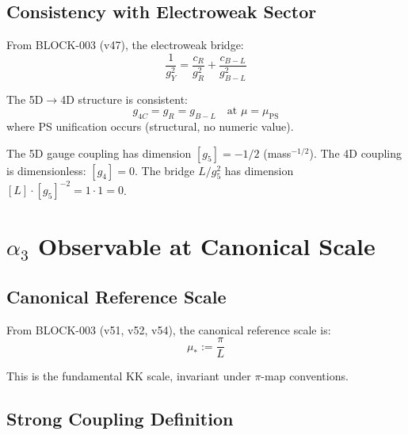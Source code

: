 \documentclass[11pt,a4paper]{article}
\theoremstyle{definition}
\begin{document}
\subsection{Consistency with Electroweak Sector}
\label{subsec:ew-consistency}

From BLOCK-003 (v47), the electroweak bridge:
\begin{equation}
  \label{eq:ew-bridge-recall}
  \frac{1}{g_Y^2} = \frac{c_R}{g_R^2} + \frac{c_{B-L}}{g_{B-L}^2}
\end{equation}

The 5D$\to$4D structure is consistent:
\begin{equation}
  \label{eq:consistency-check}
  g_{4C} = g_R = g_{B-L} \quad \text{at } \mu = \mu_{\text{PS}}
\end{equation}
where PS unification occurs (structural, no numeric value).

\begin{trapbox}
The 5D gauge coupling has dimension $[g_5] = -1/2$ (mass$^{-1/2}$).
The 4D coupling is dimensionless: $[g_4] = 0$.
The bridge $L/g_5^2$ has dimension $[L] \cdot [g_5]^{-2} = 1 \cdot 1 = 0$. \checkmark
\end{trapbox}

\newpage

\section{$\alpha_3$ Observable at Canonical Scale}
\label{sec:alpha3-observable}

\subsection{Canonical Reference Scale}
\label{subsec:reference-scale}

From BLOCK-003 (v51, v52, v54), the canonical reference scale is:
\begin{equation}
  \label{eq:mu-star-def}
  \boxed{\mu_* := \frac{\pi}{L}}
\end{equation}

This is the fundamental KK scale, invariant under $\pi$-map conventions.

\subsection{Strong Coupling Definition}
\label{subsec:alpha3-def}
\end{document}

